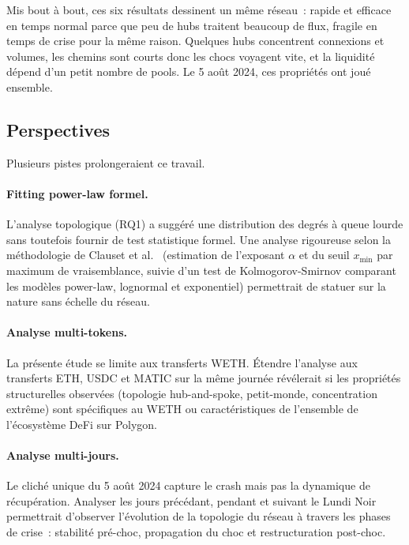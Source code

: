 Mis bout \`a bout, ces six r\'esultats dessinent un m\^eme r\'eseau~: rapide et
efficace en temps normal parce que peu de hubs traitent beaucoup de flux,
fragile en temps de crise pour la m\^eme raison. Quelques hubs concentrent
connexions et volumes, les chemins sont courts donc les chocs voyagent vite,
et la liquidit\'e d\'epend d'un petit nombre de pools. Le 5 ao\^ut 2024, ces
propri\'et\'es ont jou\'e ensemble.

\subsection{Perspectives}
\label{subsec:perspectives}

Plusieurs pistes prolongeraient ce travail.

\paragraph{Fitting power-law formel.}
L'analyse topologique (RQ1) a sugg\'er\'e une distribution des degr\'es \`a
queue lourde sans toutefois fournir de test statistique formel. Une analyse
rigoureuse selon la m\'ethodologie de Clauset et
al.~\cite{clauset2009powerlaw} (estimation de l'exposant $\alpha$ et du
seuil $x_{\min}$ par maximum de vraisemblance, suivie d'un test de
Kolmogorov-Smirnov comparant les mod\`eles power-law, lognormal et
exponentiel) permettrait de statuer sur la nature sans \'echelle du
r\'eseau.

\paragraph{Analyse multi-tokens.}
La pr\'esente \'etude se limite aux transferts WETH. \'Etendre l'analyse
aux transferts ETH, USDC et MATIC sur la m\^eme journ\'ee r\'ev\'elerait si
les propri\'et\'es structurelles observ\'ees (topologie hub-and-spoke,
petit-monde, concentration extr\^eme) sont sp\'ecifiques au WETH ou
caract\'eristiques de l'ensemble de l'\'ecosyst\`eme DeFi sur Polygon.

\paragraph{Analyse multi-jours.}
Le clich\'e unique du 5 ao\^ut 2024 capture le crash mais pas la
dynamique de r\'ecup\'eration. Analyser les jours pr\'ec\'edant, pendant et
suivant le Lundi Noir permettrait d'observer l'\'evolution de la topologie
du r\'eseau \`a travers les phases de crise~: stabilit\'e pr\'e-choc,
propagation du choc et restructuration post-choc.

